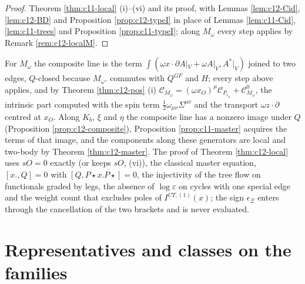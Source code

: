 \begin{proof}
Theorem \ref{thm:c11-local} (i)--(vi) and its proof, with Lemmas \ref{lem:c12-Cid}, \ref{lem:c12-BD} and Proposition \ref{prop:c12-typeI} in place of Lemmas \ref{lem:c11-Cid}, \ref{lem:c11-trees} and Proposition \ref{prop:c11-typeI}; along $M_\omega$ every step applies by Remark \ref{rem:c12-localM}.
\end{proof}

\begin{remark}
\label{rem:c12-localM}
For $M_\omega$ the composite line is the term $\int(\omega x\cdot\partial A|_V+\omega A|_V,A^*|_V)$ joined to two edges, $Q$-closed because $M_\omega.$ commutes with $Q^{GF}$ and $H$; every step above applies, and by Theorem \ref{thm:c12-pos} (i) $\mathcal C_{M_\omega}=(\omega x_O)^\mu\mathcal C_{P_{e_\mu}}+\mathcal C^0_{M_\omega}$, the intrinsic part computed with the spin term $\tfrac12\omega_{\mu\nu}\Sigma^{\mu\nu}$ and the transport $\omega z\cdot\partial$ centred at $x_O$. Along $K_b$, $\xi$ and $\eta$ the composite line has a nonzero image under $Q$ (Proposition \ref{prop:c12-composite}), Proposition \ref{prop:c11-master} acquires the terms of that image, and the components along these generators are local and two-body by Theorem \ref{thm:c12-master}. The proof of Theorem \ref{thm:c12-local} uses $sO=0$ exactly (or keeps $sO$, (vi)), the classical master equation, $[x.,Q]=0$ with $[Q,P\star x.P\star]=0$, the injectivity of the tree flow on functionals graded by legs, the absence of $\log\varepsilon$ on cycles with one special edge and the weight count that excludes poles of $I^{CT,(1)}(x)$; the sign $\epsilon_\Xi$ enters through the cancellation of the two brackets and is never evaluated.
\end{remark}

\section{Representatives and classes on the families}

